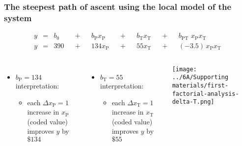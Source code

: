 \begin{frame}\frametitle{The steepest {\color{myOrange}path of ascent} using the local model of the system}

	\begin{exampleblock}{}
		\begin{align*} 
			y &=& b_0 &&+&& b_\text{P} x_\text{P} &&+&& b_\text{T} x_\text{T} &&+&& b_\text{PT}\,\,x_\text{P}x_\text{T} \\
			y &=& 390 &&+&& 134 x_\text{P}        &&+&& 55 x_\text{T}         &&+&& (-3.5)\,x_\text{P}x_\text{T} 
		\end{align*}		
	\end{exampleblock}
	
	\begin{columns}[c]
			\begin{itemize}
				\item	$b_\text{P} =134$ interpretation:
				\begin{itemize}
					\item	each $\Delta x_\text{P} = 1$ increase in $x_\text{P}$ (coded value) improves $y$ by $\$134$
				\end{itemize}
			\end{itemize}
			\pause
			\begin{itemize}
				\item	$b_\text{T} = 55$ interpretation:
				\begin{itemize}
					\item	each $\Delta x_\text{T} = 1$ increase in $x_\text{T}$ (coded value)  improves $y$ by $\$55$
				\end{itemize}
			\end{itemize}
			\centerline{\texttt{[image: ../6A/Supporting materials/first-factorial-analysis-delta-T.png]}}
	\end{columns}
\end{frame}


